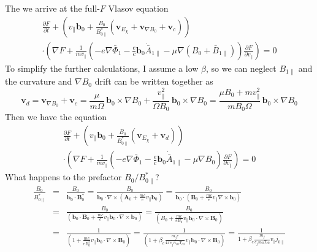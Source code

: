 The we arrive at the full-$F$ Vlasov equation
\begin{multline}
\label{eq:full_f_vlasov}
  \frac{\partial F}{\partial t}
  +\left(
    v_\|\mathbf{b}_0
    +\frac{B_0}{B_{0\|}^*}\left(
      \mathbf{v}_{E_\chi}
      +\mathbf{v}_{\nabla B_0}
      +\mathbf{v}_c
    \right)
  \right)\\
  \cdot\left(
    \nabla F
    +\frac{1}{mv_\|}\left(
      -e\nabla\bar{\Phi}_1-\frac{e}{c}\mathbf{b}_0\dot{\bar{A}}_{1\|}-\mu\nabla(B_0+\bar{B}_{1\|})
    \right)\frac{\partial F}{\partial v_\|}
  \right)=0
\end{multline}
To simplify the further calculations, I assume a low $\beta$, so we
can neglect $B_{1\|}$ and the curvature and $\nabla B_0$ drift can be
written together as
\begin{displaymath}
  \mathbf{v}_d = \mathbf{v}_{\nabla B_0}+\mathbf{v}_c
  = \frac{\mu}{m\Omega}\,\mathbf{b}_0\times\nabla B_0
  + \frac{v_\|^2}{\Omega B_0}\,\mathbf{b}_0\times\nabla B_0
  = \frac{\mu B_0+ mv_\|^2}{mB_0\Omega}
  \,\mathbf{b}_0\times\nabla B_0
\end{displaymath}
Then we have the equation
\begin{multline}
\label{eq:full_f_vlasov_lowbeta}
  \frac{\partial F}{\partial t}
  +\left(
    v_\|\mathbf{b}_0
    +\frac{B_0}{B_{0\|}^*}\left(
      \mathbf{v}_{E_\chi}
      +\mathbf{v}_d
    \right)
  \right)\\
  \cdot\left(
    \nabla F
    +\frac{1}{mv_\|}\left(
      -e\nabla\bar{\Phi}_1-\frac{e}{c}\mathbf{b}_0\dot{\bar{A}}_{1\|}-\mu\nabla B_0
    \right)\frac{\partial F}{\partial v_\|}
  \right)=0
\end{multline}
What happens to the prefactor $B_0/B_{0\|}^*$?
\begin{eqnarray*}
  \frac{B_0}{B_{0\|}^*} &=& \frac{B_0}{\mathbf{b}_0\cdot\mathbf{B}_0^*}
  =\frac{B_0}{\mathbf{b}_0\cdot\nabla\times\left(\mathbf{A}_0+\frac{mc}{e} v_\|\mathbf{b}_0\right)}
  =\frac{B_0}{\mathbf{b}_0\cdot\left(\mathbf{B}_0+\frac{mc}{e}
      v_\|\nabla\times\mathbf{b}_0\right)}\\
  &=&\frac{B_0}{\left(\mathbf{b}_0\cdot\mathbf{B}_0+\frac{mc}{e}
      v_\|\mathbf{b}_0\cdot\nabla\times\mathbf{b}_0\right)}
  =\frac{B_0}{\left(B_0+\frac{mc}{eB_0} v_\|
      \mathbf{b}_0\cdot\nabla\times\mathbf{B}_0\right)}\\
  &=&\frac{1}{\left(1+\frac{mc}{eB_0^2} v_\|
      \mathbf{b}_0\cdot\nabla\times\mathbf{B}_0\right)}
  =\frac{1}{\left(1+\beta_e\frac{m_jc}{4\pi e_jn_{e0}T_{e0}} v_\|
      \mathbf{b}_0\cdot\nabla\times\mathbf{B}_0\right)}
  =\frac{1}{1+\beta_e\frac{m_j}{e_jn_{e0}T_{e0}} v_\|j_{0\|}}
\end{eqnarray*}
